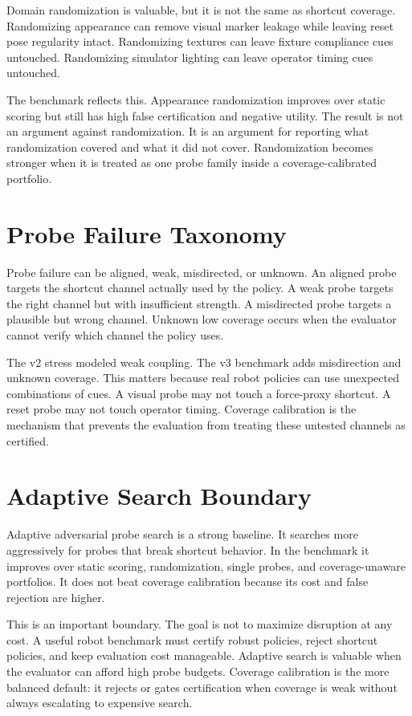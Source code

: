 \documentclass{article}
\begin{document}
Domain randomization is valuable, but it is not the same as shortcut coverage. Randomizing appearance can remove visual marker leakage while leaving reset pose regularity intact. Randomizing textures can leave fixture compliance cues untouched. Randomizing simulator lighting can leave operator timing cues untouched.

The benchmark reflects this. Appearance randomization improves over static scoring but still has high false certification and negative utility. The result is not an argument against randomization. It is an argument for reporting what randomization covered and what it did not cover. Randomization becomes stronger when it is treated as one probe family inside a coverage-calibrated portfolio.

\clearpage
\section{Probe Failure Taxonomy}

Probe failure can be aligned, weak, misdirected, or unknown. An aligned probe targets the shortcut channel actually used by the policy. A weak probe targets the right channel but with insufficient strength. A misdirected probe targets a plausible but wrong channel. Unknown low coverage occurs when the evaluator cannot verify which channel the policy uses.

The v2 stress modeled weak coupling. The v3 benchmark adds misdirection and unknown coverage. This matters because real robot policies can use unexpected combinations of cues. A visual probe may not touch a force-proxy shortcut. A reset probe may not touch operator timing. Coverage calibration is the mechanism that prevents the evaluation from treating these untested channels as certified.

\clearpage
\section{Adaptive Search Boundary}

Adaptive adversarial probe search is a strong baseline. It searches more aggressively for probes that break shortcut behavior. In the benchmark it improves over static scoring, randomization, single probes, and coverage-unaware portfolios. It does not beat coverage calibration because its cost and false rejection are higher.

This is an important boundary. The goal is not to maximize disruption at any cost. A useful robot benchmark must certify robust policies, reject shortcut policies, and keep evaluation cost manageable. Adaptive search is valuable when the evaluator can afford high probe budgets. Coverage calibration is the more balanced default: it rejects or gates certification when coverage is weak without always escalating to expensive search.
\end{document}

